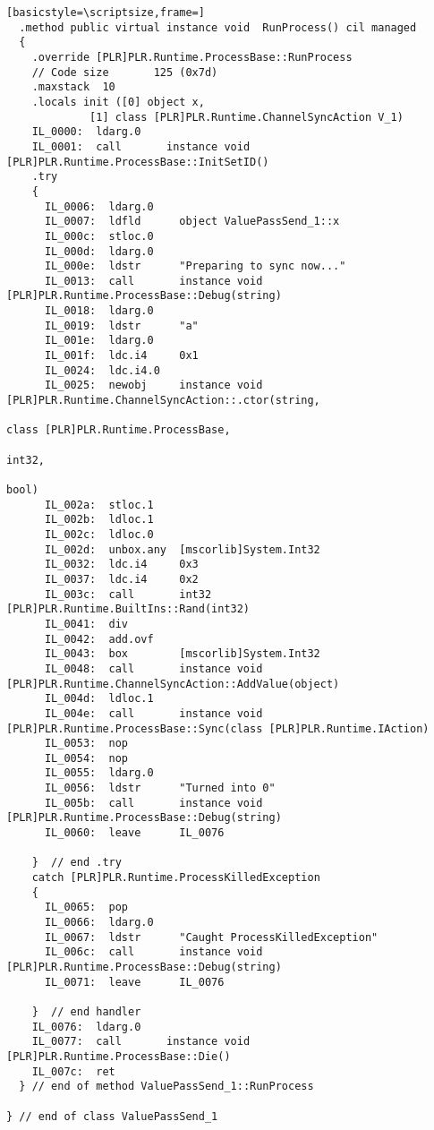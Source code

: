 \begin{lstlisting}[basicstyle=\scriptsize,frame=]
  .method public virtual instance void  RunProcess() cil managed
  {
    .override [PLR]PLR.Runtime.ProcessBase::RunProcess
    // Code size       125 (0x7d)
    .maxstack  10
    .locals init ([0] object x,
             [1] class [PLR]PLR.Runtime.ChannelSyncAction V_1)
    IL_0000:  ldarg.0
    IL_0001:  call       instance void [PLR]PLR.Runtime.ProcessBase::InitSetID()
    .try
    {
      IL_0006:  ldarg.0
      IL_0007:  ldfld      object ValuePassSend_1::x
      IL_000c:  stloc.0
      IL_000d:  ldarg.0
      IL_000e:  ldstr      "Preparing to sync now..."
      IL_0013:  call       instance void [PLR]PLR.Runtime.ProcessBase::Debug(string)
      IL_0018:  ldarg.0
      IL_0019:  ldstr      "a"
      IL_001e:  ldarg.0
      IL_001f:  ldc.i4     0x1
      IL_0024:  ldc.i4.0
      IL_0025:  newobj     instance void [PLR]PLR.Runtime.ChannelSyncAction::.ctor(string,
                                                                                   class [PLR]PLR.Runtime.ProcessBase,
                                                                                   int32,
                                                                                   bool)
      IL_002a:  stloc.1
      IL_002b:  ldloc.1
      IL_002c:  ldloc.0
      IL_002d:  unbox.any  [mscorlib]System.Int32
      IL_0032:  ldc.i4     0x3
      IL_0037:  ldc.i4     0x2
      IL_003c:  call       int32 [PLR]PLR.Runtime.BuiltIns::Rand(int32)
      IL_0041:  div
      IL_0042:  add.ovf
      IL_0043:  box        [mscorlib]System.Int32
      IL_0048:  call       instance void [PLR]PLR.Runtime.ChannelSyncAction::AddValue(object)
      IL_004d:  ldloc.1
      IL_004e:  call       instance void [PLR]PLR.Runtime.ProcessBase::Sync(class [PLR]PLR.Runtime.IAction)
      IL_0053:  nop
      IL_0054:  nop
      IL_0055:  ldarg.0
      IL_0056:  ldstr      "Turned into 0"
      IL_005b:  call       instance void [PLR]PLR.Runtime.ProcessBase::Debug(string)
      IL_0060:  leave      IL_0076

    }  // end .try
    catch [PLR]PLR.Runtime.ProcessKilledException 
    {
      IL_0065:  pop
      IL_0066:  ldarg.0
      IL_0067:  ldstr      "Caught ProcessKilledException"
      IL_006c:  call       instance void [PLR]PLR.Runtime.ProcessBase::Debug(string)
      IL_0071:  leave      IL_0076

    }  // end handler
    IL_0076:  ldarg.0
    IL_0077:  call       instance void [PLR]PLR.Runtime.ProcessBase::Die()
    IL_007c:  ret
  } // end of method ValuePassSend_1::RunProcess

} // end of class ValuePassSend_1


\end{lstlisting}
